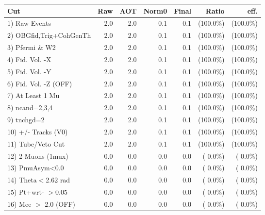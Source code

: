  \begin{table}[h!]\centering
 \begin{tabular}{||l||r|r|r|r|r|r||}
 \hline
 \hline
 Cut & Raw & AOT & Norm0 & Final & Ratio & eff.       \\
 \hline
  1) Raw Events           &          2.0 &          2.0 &          0.1 &          0.1 & (100.0\%) & (100.0\%) \\
  2) OBGfid,Trig+CohGenTh &          2.0 &          2.0 &          0.1 &          0.1 & (100.0\%) & (100.0\%) \\
  3) Pfermi \& W2         &          2.0 &          2.0 &          0.1 &          0.1 & (100.0\%) & (100.0\%) \\
  4) Fid. Vol. -X         &          2.0 &          2.0 &          0.1 &          0.1 & (100.0\%) & (100.0\%) \\
  5) Fid. Vol. -Y         &          2.0 &          2.0 &          0.1 &          0.1 & (100.0\%) & (100.0\%) \\
  6) Fid. Vol. -Z (OFF)   &          2.0 &          2.0 &          0.1 &          0.1 & (100.0\%) & (100.0\%) \\
  7) At Least 1 Mu        &          2.0 &          2.0 &          0.1 &          0.1 & (100.0\%) & (100.0\%) \\
  8) ncand=2,3,4          &          2.0 &          2.0 &          0.1 &          0.1 & (100.0\%) & (100.0\%) \\
  9) tnchgd=2             &          2.0 &          2.0 &          0.1 &          0.1 & (100.0\%) & (100.0\%) \\
 10) +/- Tracks (V0)      &          2.0 &          2.0 &          0.1 &          0.1 & (100.0\%) & (100.0\%) \\
 11) Tube/Veto Cut        &          2.0 &          2.0 &          0.1 &          0.1 & (100.0\%) & (100.0\%) \\
 12) 2 Muons (1mux)       &          0.0 &          0.0 &          0.0 &          0.0 & (  0.0\%) & (  0.0\%) \\
 13) PmuAsym<0.0          &          0.0 &          0.0 &          0.0 &          0.0 & (  0.0\%) & (  0.0\%) \\
 14) Theta$<$2.62 rad     &          0.0 &          0.0 &          0.0 &          0.0 & (  0.0\%) & (  0.0\%) \\
 15) Pt+wrt- $>$0.05      &          0.0 &          0.0 &          0.0 &          0.0 & (  0.0\%) & (  0.0\%) \\
 16) Mee $>$ 2.0  (OFF)   &          0.0 &          0.0 &          0.0 &          0.0 & (  0.0\%) & (  0.0\%) \\

\end{tabular}
\end{table}
